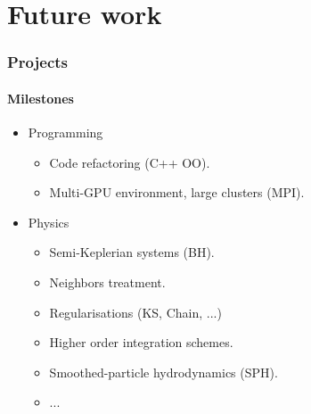 \section{Future work}
\begin{frame}
    \frametitle{Projects}
    \framesubtitle{Milestones}

    \begin{itemize}
        \item Programming
        \begin{itemize}
            \item Code refactoring (C++ OO).
            \item Multi-GPU environment, large clusters (MPI).
        \end{itemize}
        \item Physics
        \begin{itemize}
            \item Semi-Keplerian systems (BH).
            \item Neighbors treatment.
            \item Regularisations (KS, Chain, ...)
            \item Higher order integration schemes.
            \item Smoothed-particle hydrodynamics (SPH).
            \item ...
        \end{itemize}
    \end{itemize}
\end{frame}
